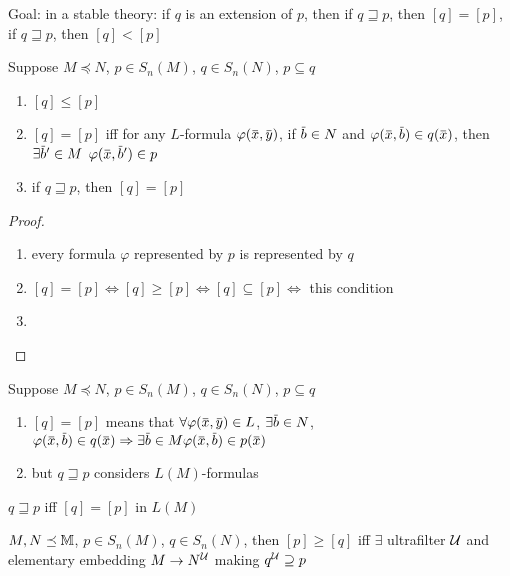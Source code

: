 \documentclass[11pt]{article}
\begin{document}
Goal: in a stable theory: if \(q\) is an extension of \(p\), then if \(q\sqsupseteq p\), then \([q]=[p]\),
if \(q\sqsupseteq p\), then \([q]<[p]\)

\begin{proposition}[]
\label{3.31.5}
Suppose \(M\preceq N\), \(p\in S_n(M)\), \(q\in S_n(N)\), \(p\subseteq q\)
\begin{enumerate}
\item \([q]\le[p]\)
\item \([q]=[p]\) iff for any \(L\)-formula \(\varphi(\barx,\bary)\), if \(\barb\in N\)
and \(\varphi(\barx,\barb)\in q(\barx)\), then \(\exists\barb'\in M\) \(\varphi(\barx,\barb')\in p\)
\item if \(q\sqsupseteq p\), then \([q]=[p]\)
\end{enumerate}
\end{proposition}

\begin{proof}
\begin{enumerate}
\item every formula \(\varphi\) represented by \(p\) is represented by \(q\)
\item \([q]=[p]\Leftrightarrow[q]\ge[p]\Leftrightarrow[q]\subseteq[p]\Leftrightarrow\) this condition
\item 
\end{enumerate}
\end{proof}

\begin{remark}
Suppose \(M\preceq N\), \(p\in S_n(M)\), \(q\in S_n(N)\), \(p\subseteq q\)
\begin{enumerate}
\item \([q]=[p]\)  means
that
\(\forall\varphi(\barx,\bary)\in L\),
\(\exists\barb\in N\), \(\varphi(\barx,\barb)\in q(\barx)\Rightarrow \exists\barb\in M\varphi(\barx,\barb)\in p(\barx)\)
\item but \(q\sqsupseteq p\) considers \(L(M)\)-formulas
\end{enumerate}


\(q\sqsupseteq p\) iff \([q]=[p]\) in \(L(M)\)
\end{remark}

\begin{proposition}[]
\label{3.31.7}
\(M,N\preceq\mathbb{M}\), \(p\in S_n(M)\), \(q\in S_n(N)\), then \([p]\ge[q]\) iff \(\exists\) ultrafilter \(\mathcal{U}\) and
elementary embedding \(M\to N^{\mathcal{U}}\) making \(q^{\mathcal{U}}\supseteq p\)
\end{proposition}
\end{document}
